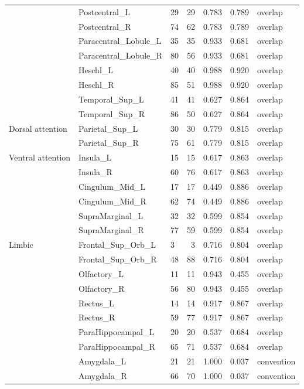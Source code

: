 \documentclass[a4paper,10pt]{article}
\begin{document}
\begin{longtable}{lllrrrl}
 & Postcentral\_L & 29 & 29 & 0.783 & 0.789 & overlap \\
 & Postcentral\_R & 74 & 62 & 0.783 & 0.789 & overlap \\
 & Paracentral\_Lobule\_L & 35 & 35 & 0.933 & 0.681 & overlap \\
 & Paracentral\_Lobule\_R & 80 & 56 & 0.933 & 0.681 & overlap \\
 & Heschl\_L & 40 & 40 & 0.988 & 0.920 & overlap \\
 & Heschl\_R & 85 & 51 & 0.988 & 0.920 & overlap \\
 & Temporal\_Sup\_L & 41 & 41 & 0.627 & 0.864 & overlap \\
 & Temporal\_Sup\_R & 86 & 50 & 0.627 & 0.864 & overlap \\
\midrule
Dorsal attention & Parietal\_Sup\_L & 30 & 30 & 0.779 & 0.815 & overlap \\
 & Parietal\_Sup\_R & 75 & 61 & 0.779 & 0.815 & overlap \\
\midrule
Ventral attention & Insula\_L & 15 & 15 & 0.617 & 0.863 & overlap \\
 & Insula\_R & 60 & 76 & 0.617 & 0.863 & overlap \\
 & Cingulum\_Mid\_L & 17 & 17 & 0.449 & 0.886 & overlap \\
 & Cingulum\_Mid\_R & 62 & 74 & 0.449 & 0.886 & overlap \\
 & SupraMarginal\_L & 32 & 32 & 0.599 & 0.854 & overlap \\
 & SupraMarginal\_R & 77 & 59 & 0.599 & 0.854 & overlap \\
\midrule
Limbic & Frontal\_Sup\_Orb\_L & 3 & 3 & 0.716 & 0.804 & overlap \\
 & Frontal\_Sup\_Orb\_R & 48 & 88 & 0.716 & 0.804 & overlap \\
 & Olfactory\_L & 11 & 11 & 0.943 & 0.455 & overlap \\
 & Olfactory\_R & 56 & 80 & 0.943 & 0.455 & overlap \\
 & Rectus\_L & 14 & 14 & 0.917 & 0.867 & overlap \\
 & Rectus\_R & 59 & 77 & 0.917 & 0.867 & overlap \\
 & ParaHippocampal\_L & 20 & 20 & 0.537 & 0.684 & overlap \\
 & ParaHippocampal\_R & 65 & 71 & 0.537 & 0.684 & overlap \\
 & Amygdala\_L & 21 & 21 & 1.000 & 0.037 & convention \\
 & Amygdala\_R & 66 & 70 & 1.000 & 0.037 & convention \\

\end{longtable}
\end{document}
